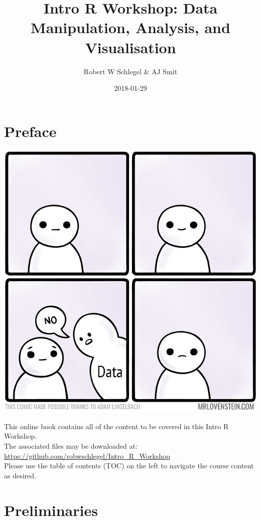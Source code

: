 \documentclass[]{book}
\title{Intro R Workshop: Data Manipulation, Analysis, and Visualisation}
\author{Robert W Schlegel \& AJ Smit}
\date{2018-01-29}
\theoremstyle{definition}
\theoremstyle{definition}
\theoremstyle{definition}
\theoremstyle{remark}
\begin{document}
\maketitle

{
\setcounter{tocdepth}{1}
\tableofcontents
}
\chapter*{Preface}\label{preface}

\begin{center}\includegraphics[width=1\linewidth]{figures/769_life_finds_a_way} \end{center}

This online book contains all of the content to be covered in this Intro
R Workshop.\\
The associated files may be downloaded at:
\url{https://github.com/robwschlegel/Intro_R_Workshop}\\
Please use the table of contents (TOC) on the left to navigate the
course content as desired.

\chapter{Preliminaries}\label{prelim}
\end{document}
